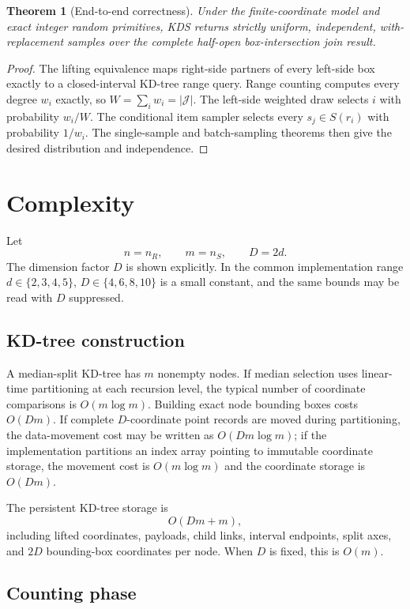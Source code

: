 \documentclass[11pt]{article}
\theoremstyle{definition}
\theoremstyle{plain}
\newtheorem{theorem}{Theorem}[section]
\theoremstyle{remark}
\newcommand{\Jset}{\mathcal J}
\begin{document}
\begin{theorem}[End-to-end correctness]
Under the finite-coordinate model and exact integer random primitives, KDS returns strictly
uniform, independent, with-replacement samples over the complete half-open box-intersection
join result.
\end{theorem}

\begin{proof}
The lifting equivalence maps right-side partners of every left-side box exactly to a
closed-interval KD-tree range query.  Range counting computes every degree $w_i$ exactly, so
$W=\sum_iw_i=|\Jset|$.  The left-side weighted draw selects $i$ with probability $w_i/W$.
The conditional item sampler selects every $s_j\in S(r_i)$ with probability $1/w_i$.  The
single-sample and batch-sampling theorems then give the desired distribution and independence.
\end{proof}

\section{Complexity}

Let
\[
  n=n_R,
  \qquad
  m=n_S,
  \qquad
  D=2d.
\]
The dimension factor $D$ is shown explicitly.  In the common implementation range
$d\in\{2,3,4,5\}$, $D\in\{4,6,8,10\}$ is a small constant, and the same bounds may be read
with $D$ suppressed.

\subsection{KD-tree construction}

A median-split KD-tree has $m$ nonempty nodes.  If median selection uses linear-time
partitioning at each recursion level, the typical number of coordinate comparisons is
$O(m\log m)$.  Building exact node bounding boxes costs $O(Dm)$.  If complete $D$-coordinate
point records are moved during partitioning, the data-movement cost may be written as
$O(Dm\log m)$; if the implementation partitions an index array pointing to immutable
coordinate storage, the movement cost is $O(m\log m)$ and the coordinate storage is
$O(Dm)$.

The persistent KD-tree storage is
\[
  O(Dm+m),
\]
including lifted coordinates, payloads, child links, interval endpoints, split axes, and
$2D$ bounding-box coordinates per node.  When $D$ is fixed, this is $O(m)$.

\subsection{Counting phase}
\end{document}
